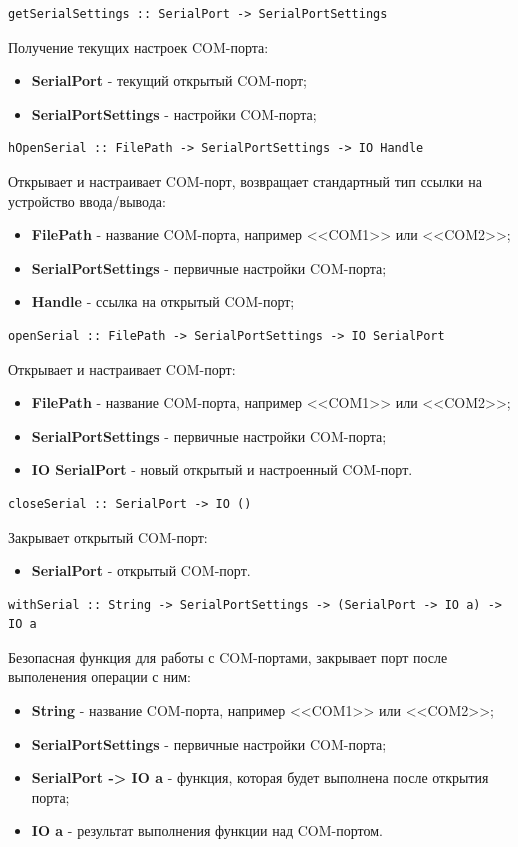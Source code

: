 \documentclass[russian,utf8,simple,emptystyle]{eskdtext}
\begin{document}
\begin{lstlisting}
getSerialSettings :: SerialPort -> SerialPortSettings
\end{lstlisting}
Получение текущих настроек COM-порта:
\begin{itemize}
\item \textbf{SerialPort} - текущий открытый COM-порт;
\item \textbf{SerialPortSettings} - настройки COM-порта;
\end{itemize}

\begin{lstlisting}
hOpenSerial :: FilePath -> SerialPortSettings -> IO Handle
\end{lstlisting}
Открывает и настраивает COM-порт, возвращает стандартный тип ссылки на устройство ввода/вывода:
\begin{itemize}
\item \textbf{FilePath} - название COM-порта, например <<COM1>> или <<COM2>>;
\item \textbf{SerialPortSettings} - первичные настройки COM-порта;
\item \textbf{Handle} - ссылка на открытый COM-порт;
\end{itemize}

\begin{lstlisting}
openSerial :: FilePath -> SerialPortSettings -> IO SerialPort
\end{lstlisting}
Открывает и настраивает COM-порт:
\begin{itemize}
\item \textbf{FilePath} - название COM-порта, например <<COM1>> или <<COM2>>;
\item \textbf{SerialPortSettings} - первичные настройки COM-порта;
\item \textbf{IO SerialPort} - новый открытый и настроенный COM-порт.
\end{itemize}

\begin{lstlisting}
closeSerial :: SerialPort -> IO ()
\end{lstlisting}
Закрывает открытый COM-порт:
\begin{itemize}
\item \textbf{SerialPort} - открытый COM-порт.
\end{itemize}

\begin{lstlisting}
withSerial :: String -> SerialPortSettings -> (SerialPort -> IO a) -> IO a
\end{lstlisting}
Безопасная функция для работы с COM-портами, закрывает порт после выполенения операции с ним:
\begin{itemize}
\item \textbf{String} - название COM-порта, например <<COM1>> или <<COM2>>;
\item \textbf{SerialPortSettings} - первичные настройки COM-порта;
\item \textbf{SerialPort -> IO a} - функция, которая будет выполнена после открытия порта;
\item \textbf{IO a} - результат выполнения функции над COM-портом.
\end{itemize}
\end{document}
